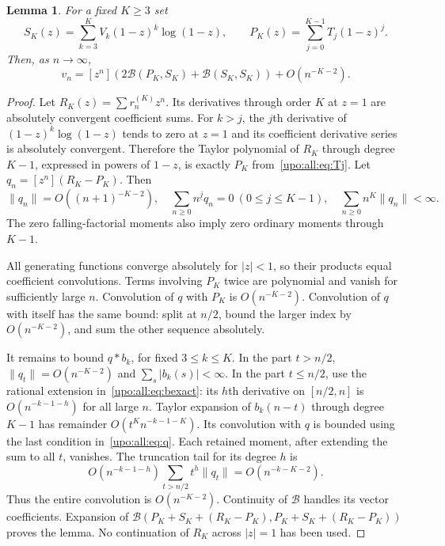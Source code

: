 \documentclass[11pt,letterpaper]{article}
\newtheorem{lemma}[theorem]{Lemma}
\theoremstyle{remark}\newtheorem{remark}[theorem]{Remark}
\numberwithin{equation}{section}
\newcommand{\B}{\mathcal B}
\newcommand{\fall}[2]{#1^{\underline{#2}}}
\begin{document}
\begin{lemma}\label{upo:all:lem:remainder}
For a fixed $K\ge3$ set
\[
S_K(z)=\sum_{k=3}^KV_k(1-z)^k\log(1-z),\qquad
P_K(z)=\sum_{j=0}^{K-1}T_j(1-z)^j.
\]
Then, as $n\to\infty$,
\begin{equation}\label{upo:all:eq:finitecalc}
v_n=[z^n]\left(2\B(P_K,S_K)+\B(S_K,S_K)\right)
 +O(n^{-K-2}).
\end{equation}
\end{lemma}
\begin{proof}
Let $R_K(z)=\sum r_n^{(K)}z^n$. Its derivatives through order $K$ at
$z=1$ are absolutely convergent coefficient sums. For $k>j$, the
$j$th derivative of $(1-z)^k\log(1-z)$ tends to zero at $z=1$ and its
coefficient derivative series is absolutely convergent. Therefore the
Taylor polynomial of $R_K$ through degree $K-1$, expressed in powers
of $1-z$, is exactly $P_K$ from~\eqref{upo:all:eq:Tj}.
Let $q_n=[z^n](R_K-P_K)$. Then
\begin{equation}\label{upo:all:eq:q}
\|q_n\|=O((n+1)^{-K-2}),\quad
\sum_{n\ge0}\fall njq_n=0\ (0\le j\le K-1),\quad
\sum_{n\ge0}n^K\|q_n\|<\infty.
\end{equation}
The zero falling-factorial moments also imply zero ordinary moments
through $K-1$.

All generating functions converge absolutely for $|z|<1$, so their
products equal coefficient convolutions. Terms involving $P_K$ twice
are polynomial and vanish for sufficiently large $n$. Convolution of
$q$ with $P_K$ is $O(n^{-K-2})$. Convolution of $q$ with itself has the
same bound: split at $n/2$, bound the larger index by $O(n^{-K-2})$,
and sum the other sequence absolutely.

It remains to bound $q*b_k$, for fixed $3\le k\le K$. In the part
$t>n/2$, $\|q_t\|=O(n^{-K-2})$ and $\sum_s|b_k(s)|<\infty$.
In the part $t\le n/2$, use the rational extension in~\eqref{upo:all:eq:bexact}:
its $h$th derivative on $[n/2,n]$ is $O(n^{-k-1-h})$ for all large $n$.
Taylor expansion of $b_k(n-t)$ through degree $K-1$ has remainder
$O(t^Kn^{-k-1-K})$. Its convolution with $q$ is bounded using the last
condition in~\eqref{upo:all:eq:q}. Each retained moment, after extending the
sum to all $t$, vanishes. The truncation tail for its degree $h$ is
\[
O(n^{-k-1-h})\sum_{t>n/2}t^h\|q_t\|
 =O(n^{-k-K-2}).
\]
Thus the entire convolution is $O(n^{-K-2})$. Continuity of $\B$ handles
its vector coefficients. Expansion of
$\B(P_K+S_K+(R_K-P_K),P_K+S_K+(R_K-P_K))$ proves the lemma.
No continuation of $R_K$ across $|z|=1$ has been used.
\end{proof}
\end{document}
